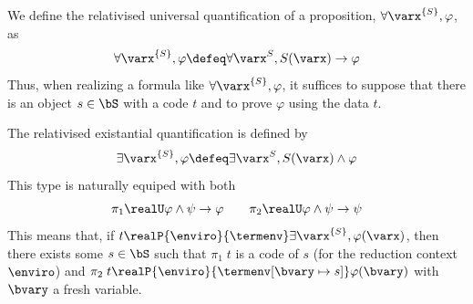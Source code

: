 
\begin{notation}
  We define the relativised universal quantification of a proposition, $\forall \varx^{\{S\}}, \varphi$, as
  \[\forall \varx^{\{S\}}, \varphi \defeq \forall \varx^S, S(\varx) \to \varphi\]
  Thus, when realizing a formula like $\forall \varx^{\{S\}}, \varphi$, it suffices to suppose that there is an object $s \in \bS$ with a code $t$ and to prove $\varphi$ using the data $t$.

  The relativised existantial quantification is defined by
  \[\exists \varx^{\{S\}}, \varphi \defeq \exists \varx^{S}, S(\varx) \land \varphi\]
  This type is naturally equiped with both
  \[\pi_1 \realU \varphi \land \psi \to \varphi \qquad \pi_2 \realU \varphi \land \psi \to \psi\]
  This means that, if $t\realP{\enviro}{\termenv} \exists\varx^{\{S\}}, \varphi(\varx)$, then there exists some $s \in \bS$ such that $\pi_1\;t$ is a code of $s$ (for the reduction context $\enviro$) and $\pi_2\;t \realP{\enviro}{\termenv[\bvary\mapsto s]} \varphi(\bvary)$ with $\bvary$ a fresh variable.
\end{notation}
